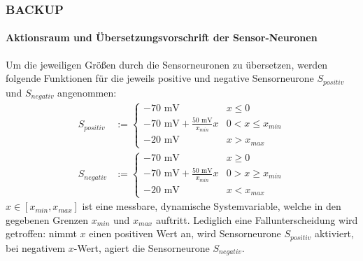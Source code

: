 \documentclass[10pt,t,aspectratio=1610]{beamer}
\newcommand{\ChapterBackup}{BACKUP}
\begin{document}

\begin{frame}
	\frametitle{\ChapterBackup}
	\framesubtitle{Aktionsraum und Übersetzungsvorschrift der Sensor-Neuronen}
	\vspace{0.3cm}
	Um die jeweiligen Größen durch die Sensorneuronen zu übersetzen, werden folgende Funktionen für die jeweils positive und negative Sensorneurone $S_{positiv}$ und $S_{negativ}$ angenommen:
	\begin{align}
	\label{eq:sensor_translation_p}
	S_{positiv} &:= \begin{cases}-70\text{ mV} & x\leq 0\\-70\text{ mV} + \frac{50\text{ mV}}{x_{min}}x & 0 < x \leq x_{min} \\-20\text{ mV} & x > x_{max}  \end{cases}\\
	\label{eq:sensor_translation_n}
	S_{negativ} &:= \begin{cases}-70\text{ mV} & x\geq 0\\-70\text{ mV} + \frac{50\text{ mV}}{x_{min}}x & 0 > x \geq x_{min} \\-20\text{ mV} & x < x_{max}  \end{cases}
	\end{align}
	$x\in[x_{min}, x_{max}]$ ist eine messbare, dynamische Systemvariable, welche in den gegebenen Grenzen $x_{min} $ und $x_{max}$ auftritt. Lediglich eine Fallunterscheidung wird getroffen: nimmt $x$ einen positiven Wert an, wird Sensorneurone $S_{positiv}$ aktiviert, bei negativem $x$-Wert, agiert die Sensorneurone $S_{negativ}$.
\end{frame}

\end{document}
